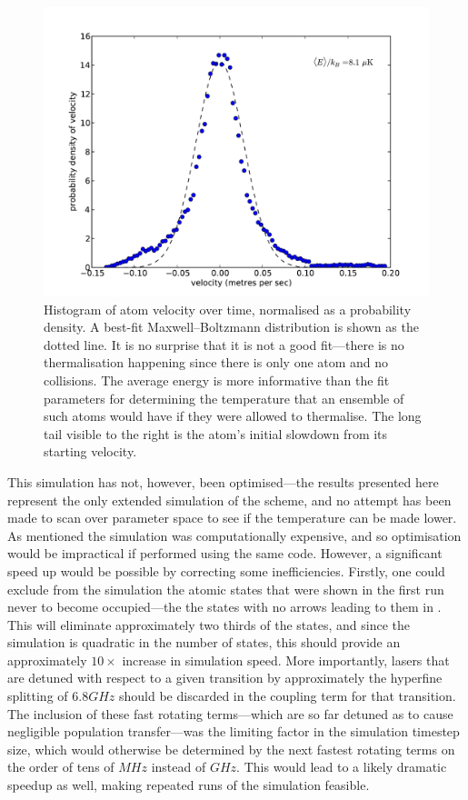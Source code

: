 \begin{figure}
\begin{center}
\includegraphics[width=\textwidth]{figures/unsorted/cold_atom.pdf}
\caption{\label{fig:cold_atom} Histogram of atom velocity over time, normalised as a probability density. A best-fit Maxwell--Boltzmann distribution is shown as the dotted line. It is no surprise that it is not a good fit---there is no thermalisation happening since there is only one atom and no collisions. The average energy is more informative than the fit parameters for determining the temperature that an ensemble of such atoms would have if they were allowed to thermalise. The long tail visible to the right is the atom's initial slowdown from its starting velocity.}
\end{center}
\end{figure}

This simulation has not, however, been optimised---the results presented here represent the only extended simulation of the scheme, and no attempt has been made to scan over parameter space to see if the temperature can be made lower. As mentioned the simulation was computationally expensive, and so optimisation would be impractical if performed using the same code. However, a significant speed up would be possible by correcting some inefficiencies. Firstly, one could exclude from the simulation the atomic states that were shown in the first run never to become occupied---the the states with no arrows leading to them in . This will eliminate approximately two thirds of the states, and since the simulation is quadratic in the number of states, this should provide an approximately $10\times$ increase in simulation speed. More importantly, lasers that are detuned with respect to a given transition by approximately the hyperfine splitting of $6.8\unit{GHz}$ should be discarded in the coupling term for that transition. The inclusion of these fast rotating terms---which are so far detuned as to cause negligible population transfer---was the limiting factor in the simulation timestep size, which would otherwise be determined by the next fastest rotating terms on the order of tens of $\unit{MHz}$ instead of $\unit{GHz}$. This would lead to a likely dramatic speedup as well, making repeated runs of the simulation feasible.

